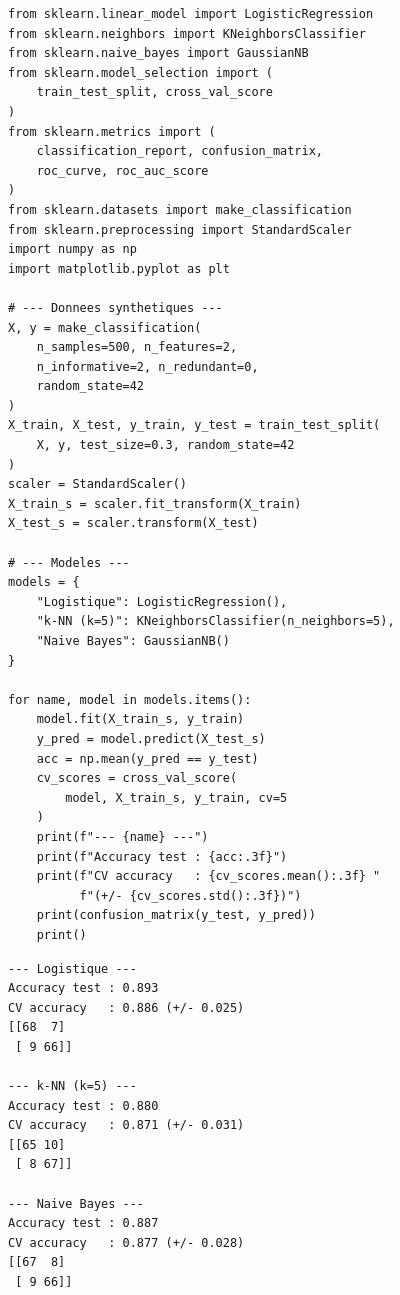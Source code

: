 \begin{codeblock}[title=\textbf{Logistique, $k$-NN et Na\"ive Bayes -- scikit-learn}]
\begin{verbatim}
from sklearn.linear_model import LogisticRegression
from sklearn.neighbors import KNeighborsClassifier
from sklearn.naive_bayes import GaussianNB
from sklearn.model_selection import (
    train_test_split, cross_val_score
)
from sklearn.metrics import (
    classification_report, confusion_matrix,
    roc_curve, roc_auc_score
)
from sklearn.datasets import make_classification
from sklearn.preprocessing import StandardScaler
import numpy as np
import matplotlib.pyplot as plt

# --- Donnees synthetiques ---
X, y = make_classification(
    n_samples=500, n_features=2,
    n_informative=2, n_redundant=0,
    random_state=42
)
X_train, X_test, y_train, y_test = train_test_split(
    X, y, test_size=0.3, random_state=42
)
scaler = StandardScaler()
X_train_s = scaler.fit_transform(X_train)
X_test_s = scaler.transform(X_test)

# --- Modeles ---
models = {
    "Logistique": LogisticRegression(),
    "k-NN (k=5)": KNeighborsClassifier(n_neighbors=5),
    "Naive Bayes": GaussianNB()
}

for name, model in models.items():
    model.fit(X_train_s, y_train)
    y_pred = model.predict(X_test_s)
    acc = np.mean(y_pred == y_test)
    cv_scores = cross_val_score(
        model, X_train_s, y_train, cv=5
    )
    print(f"--- {name} ---")
    print(f"Accuracy test : {acc:.3f}")
    print(f"CV accuracy   : {cv_scores.mean():.3f} "
          f"(+/- {cv_scores.std():.3f})")
    print(confusion_matrix(y_test, y_pred))
    print()
\end{verbatim}
\end{codeblock}

\begin{codeoutput}
\begin{verbatim}
--- Logistique ---
Accuracy test : 0.893
CV accuracy   : 0.886 (+/- 0.025)
[[68  7]
 [ 9 66]]

--- k-NN (k=5) ---
Accuracy test : 0.880
CV accuracy   : 0.871 (+/- 0.031)
[[65 10]
 [ 8 67]]

--- Naive Bayes ---
Accuracy test : 0.887
CV accuracy   : 0.877 (+/- 0.028)
[[67  8]
 [ 9 66]]
\end{verbatim}
\end{codeoutput}

